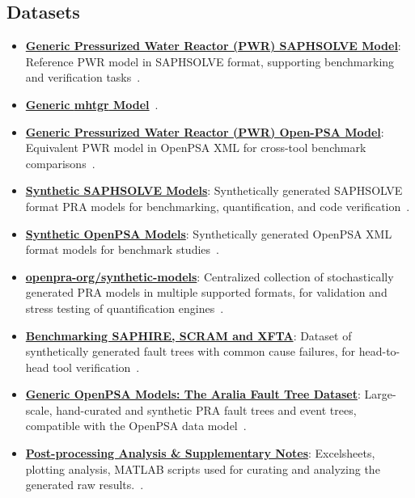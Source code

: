 \subsection{Datasets}
\begin{itemize}
    \item \textbf{\href{https://doi.org/10.5281/zenodo.13996959}{Generic Pressurized Water Reactor (PWR) SAPHSOLVE Model}}: Reference PWR model in SAPHSOLVE format, supporting benchmarking and verification tasks~\cite{aras_generic_2024}.

    \item \textbf{\href{https://doi.org/10.5281/zenodo.14070453}{Generic \acrfull{mhtgr} Model}}~\cite{ hamza_openpra-orggeneric-mhtgr-model_2025}.
   
    \item \textbf{\href{https://doi.org/10.5281/zenodo.14070453}{Generic Pressurized Water Reactor (PWR) Open-PSA Model}}: Equivalent PWR model in OpenPSA XML for cross-tool benchmark comparisons~\cite{aras_generic_2024-1}.

    \item \textbf{\href{https://doi.org/10.5281/zenodo.13996735}{Synthetic SAPHSOLVE Models}}: Synthetically generated SAPHSOLVE format PRA models for benchmarking, quantification, and code verification~\cite{aras_synthetic_2024}.
    
    \item \textbf{\href{https://doi.org/10.5281/zenodo.13996370}{Synthetic OpenPSA Models}}: Synthetically generated OpenPSA XML format models for benchmark studies~\cite{aras_synthetic_2024-1}.
    
    \item \textbf{\href{https://doi.org/10.5281/zenodo.15320670}{openpra-org/synthetic-models}}: Centralized collection of stochastically generated PRA models in multiple supported formats, for validation and stress testing of quantification engines~\cite{aras_synthetic_2025}.
    
    \item \textbf{\href{https://doi.org/10.5281/zenodo.7706615}{Benchmarking SAPHIRE, SCRAM and XFTA}}: Dataset of synthetically generated fault trees with common cause failures, for head-to-head tool verification~\cite{earthperson_dataset_2023}.
    
    \item \textbf{\href{https://doi.org/10.5281/zenodo.15293416}{Generic OpenPSA Models: The Aralia Fault Tree Dataset}}: Large-scale, hand-curated and synthetic PRA fault trees and event trees, compatible with the OpenPSA data model~\cite{earthperson_generic_2021}.

    \item \textbf{\href{https://zenodo.org/doi/10.5281/zenodo.15320401}{Post-processing Analysis \& Supplementary Notes}}: Excelsheets, plotting analysis, MATLAB scripts used for curating and analyzing the generated raw results.~\cite{earthperson_benchmarks_2025}.
\end{itemize}